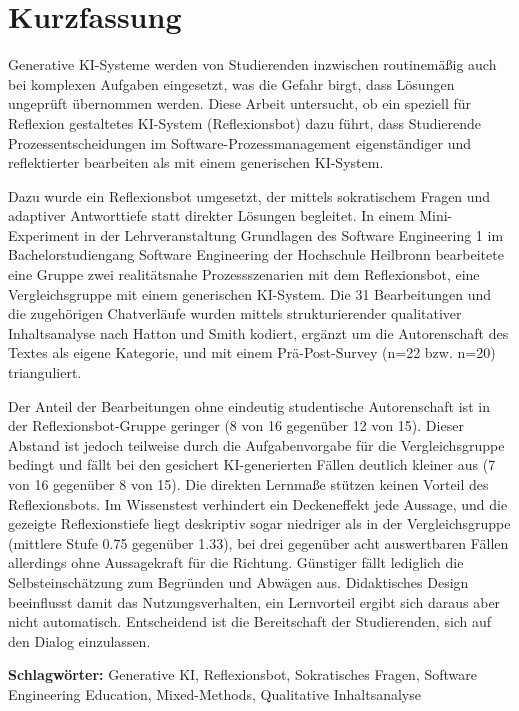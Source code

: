 \chapter*{Kurzfassung}

Generative KI-Systeme werden von Studierenden inzwischen routinemäßig auch bei komplexen Aufgaben
eingesetzt, was die Gefahr birgt, dass Lösungen ungeprüft übernommen werden. Diese Arbeit untersucht,
ob ein speziell für Reflexion gestaltetes KI-System (Reflexionsbot) dazu führt, dass Studierende
Prozessentscheidungen im Software-Prozessmanagement eigenständiger und reflektierter bearbeiten als
mit einem generischen KI-System.

Dazu wurde ein Reflexionsbot umgesetzt, der mittels sokratischem Fragen und adaptiver Antworttiefe
statt direkter Lösungen begleitet. In einem Mini-Experiment in der Lehrveranstaltung \glqq Grundlagen
des Software Engineering 1\grqq{} im Bachelorstudiengang Software Engineering der Hochschule
Heilbronn bearbeitete eine Gruppe zwei realitätsnahe Prozessszenarien mit dem Reflexionsbot, eine
Vergleichsgruppe mit einem generischen KI-System. Die 31 Bearbeitungen und die zugehörigen
Chatverläufe wurden mittels strukturierender qualitativer Inhaltsanalyse nach Hatton und Smith
kodiert, ergänzt um die Autorenschaft des Textes als eigene Kategorie, und mit einem Prä-Post-Survey
(n=22 bzw. n=20) trianguliert.

Der Anteil der Bearbeitungen ohne eindeutig studentische Autorenschaft ist in der
Reflexionsbot-Gruppe geringer (8 von 16 gegenüber 12 von 15). Dieser Abstand ist jedoch teilweise
durch die Aufgabenvorgabe für die Vergleichsgruppe bedingt und fällt bei den gesichert KI-generierten
Fällen deutlich kleiner aus (7 von 16 gegenüber 8 von 15). Die direkten Lernmaße stützen keinen
Vorteil des Reflexionsbots. Im Wissenstest verhindert ein Deckeneffekt jede Aussage, und die gezeigte
Reflexionstiefe liegt deskriptiv sogar niedriger als in der Vergleichsgruppe (mittlere Stufe 0.75
gegenüber 1.33), bei drei gegenüber acht auswertbaren Fällen allerdings ohne Aussagekraft für die
Richtung. Günstiger fällt lediglich die Selbsteinschätzung zum Begründen und Abwägen aus. Didaktisches
Design beeinflusst damit das Nutzungsverhalten, ein Lernvorteil ergibt sich daraus aber nicht
automatisch. Entscheidend ist die Bereitschaft der Studierenden, sich auf den Dialog einzulassen.

\vspace{1em}
\noindent\textbf{Schlagwörter:} Generative KI, Reflexionsbot, Sokratisches Fragen, Software
Engineering Education, Mixed-Methods, Qualitative Inhaltsanalyse
